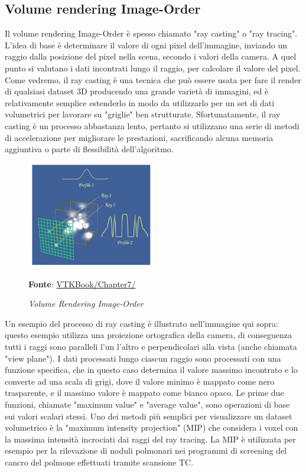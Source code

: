 \subsection{Volume rendering Image-Order}\label{sec:volume-image-order}
Il volume rendering Image-Order è spesso chiamato "ray casting" o "ray tracing". L'idea di base è determinare il valore di ogni pixel dell'immagine, inviando un raggio dalla posizione del pixel nella scena, secondo i valori della camera. A quel punto si  valutano i dati incontrati lungo il raggio, per calcolare il valore del pixel. Come vedremo, il ray casting è una tecnica che può essere usata per fare il render di qualsiasi dataset 3D producendo una grande varietà di immagini, ed è relativamente semplice estenderlo in modo da utilizzarlo per un set di dati volumetrici per lavorare su "griglie" ben strutturate. Sfortunatamente, il ray casting è un processo abbastanza lento, pertanto si utilizzano una serie di metodi di accelerazione per migliorare le prestazioni, sacrificando alcuna memoria aggiuntiva o parte di flessibilità dell'algoritmo.

\begin{figure}[h]
    \centering
    \includegraphics[width=0.5\textwidth]{immagini/volumerendering/imageorder.png}
    \caption{\textit{Volume Rendering Image-Order}}
    \textbf{Fonte}: \href{https://lorensen.github.io/VTKExamples/site/VTKBook/07Chapter7/}{VTKBook/Chapter7/}
    \label{fig: Volume Rendering Image-Order}
\end{figure}

Un esempio del processo di ray casting è illustrato nell'immagine qui sopra: questo esempio utilizza una proiezione ortografica della camera, di conseguenza tutti i raggi sono paralleli l'un l'altro e perpendicolari alla vista (anche chiamata "view plane"). I dati processati lungo ciascun raggio sono processati con una funzione specifica, che in questo caso determina il valore massimo incontrato e lo converte ad una scala di grigi, dove il valore minimo è mappato come nero trasparente, e il massimo valore è mappato come bianco opaco. Le prime due funzioni, chiamate "maximum value" e "average value", sono operazioni di base sui valori scalari stessi. Uno dei metodi più semplici per visualizzare un dataset volumetrico è la "maximum intensity projection" (MIP) che considera i voxel con la massima intensità incrociati dai raggi del ray tracing. La MIP è utilizzata per esempio per la rilevazione di noduli polmonari nei programmi di screening del cancro del polmone effettuati tramite scansione TC.

